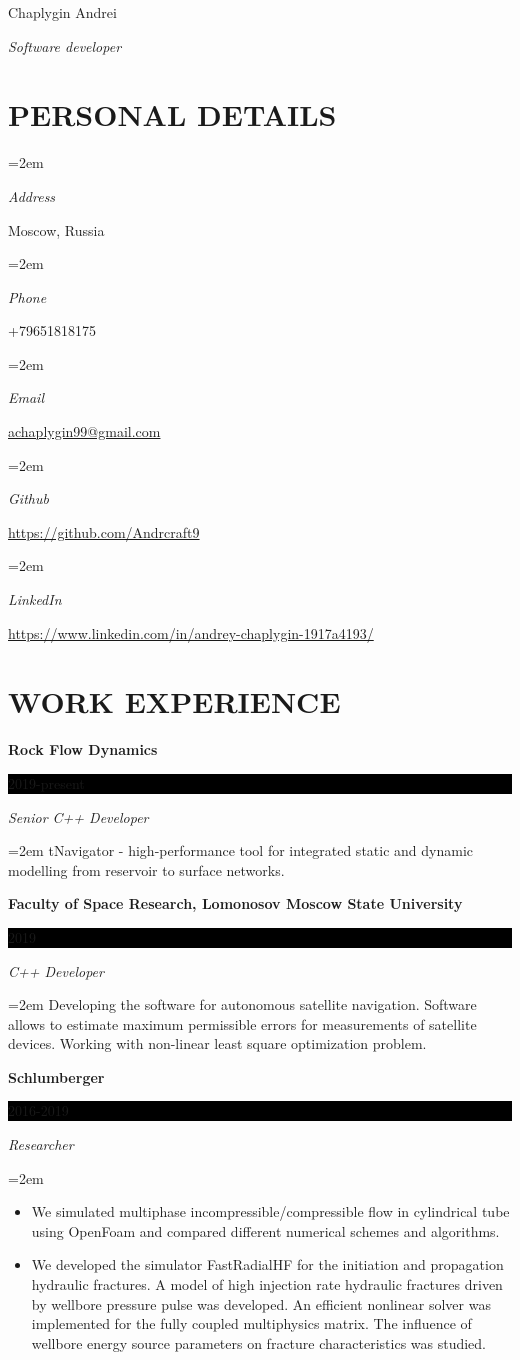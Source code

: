 \documentclass[paper=a4,fontsize=11pt]{scrartcl}
\newlength{\spacebox}
\newcommand{\sepspace}{\vspace*{1em}}		%
\newcommand{\MyName}[1]{ %
		\Huge \usefont{OT1}{phv}{b}{n} \hfill #1
		\par \normalsize \normalfont}
\newcommand{\MySlogan}[1]{ %
		\large \usefont{OT1}{phv}{m}{n}\hfill \textit{#1}
		\par \normalsize \normalfont}
\newcommand{\NewPart}[1]{\section*{\uppercase{#1}}}
\newcommand{\PersonalEntry}[2]{
		\noindent\hangindent=2em\hangafter=0 %
		\parbox{\spacebox}{        %
		\textit{#1}}		       %
		\hspace{1.5em} #2 \par}    %
\newcommand{\EducationEntry}[4]{
		\noindent \textbf{#1} \hfill      %
		\colorbox{Black}{%
			\parbox{6em}{%
			\hfill\color{White}#2}} \par  %
		\noindent \textit{#3} \par        %
		\noindent\hangindent=2em\hangafter=0 \small #4 %
		\normalsize \par}
\begin{document}

\MyName{Chaplygin Andrei}
\MySlogan{Software developer}

\sepspace

\NewPart{Personal details}{}

\PersonalEntry{Address}{Moscow, Russia}
\PersonalEntry{Phone}{+79651818175}
\PersonalEntry{Email}{\url{achaplygin99@gmail.com}}
\PersonalEntry{Github}{\url{https://github.com/Andrcraft9}}
\PersonalEntry{LinkedIn}{\url{https://www.linkedin.com/in/andrey-chaplygin-1917a4193/}}

\NewPart{Work experience}{}

\EducationEntry{Rock Flow Dynamics}{2019-present}{Senior C++ Developer}
{
tNavigator - high-performance tool for integrated static and dynamic modelling from reservoir to surface networks.
}

\EducationEntry{Faculty of Space Research, Lomonosov Moscow State University }{2019}{C++ Developer}
{
Developing the software for autonomous satellite navigation. Software allows to estimate maximum permissible errors for measurements of satellite devices. Working with non-linear least square optimization problem. 
}
\sepspace

\EducationEntry{Schlumberger}{2016-2019}{Researcher} %
{
\begin{itemize}
 \item
 
 We simulated multiphase incompressible/compressible flow in cylindrical tube using OpenFoam and compared different numerical schemes and algorithms.
 
 \item We developed the simulator FastRadialHF for the initiation and propagation hydraulic fractures. 
A model of high injection rate hydraulic fractures driven by wellbore pressure pulse was developed. 
An efficient nonlinear solver was implemented for the fully coupled multiphysics matrix.
The influence of wellbore energy source parameters on fracture characteristics was studied.
\end{itemize}

}
\sepspace
\end{document}
